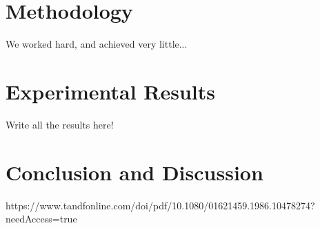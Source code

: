 \documentclass[10pt]{article}
\begin{document}
\section{Methodology}\label{sec:4}
We worked hard, and achieved very little...

\newpage

\section{Experimental Results}\label{sec:5}

Write all the results here!

\section{Conclusion and Discussion}\label{sec:6}



 
 
https://www.tandfonline.com/doi/pdf/10.1080/01621459.1986.10478274?needAccess=true
\end{document}
